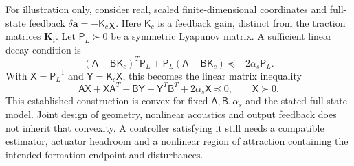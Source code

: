 For illustration only, consider real, scaled finite-dimensional coordinates
and full-state feedback $\delta\bm a=-\mathsf K_c\bm\chi$. Here
$\mathsf K_c$ is a feedback gain, distinct from the traction matrices
$\bm K_i$. Let $\mathsf P_L\succ0$ be a symmetric Lyapunov matrix. A
sufficient linear decay condition is
\begin{equation}
 (\mathsf A-\mathsf B\mathsf K_c)^T\mathsf P_L
 +\mathsf P_L(\mathsf A-\mathsf B\mathsf K_c)
 \preceq-2\alpha_s\mathsf P_L.
 \label{eq:lyapunov}
\end{equation}
With $\mathsf X=\mathsf P_L^{-1}$ and $\mathsf Y=\mathsf K_c\mathsf X$, this
becomes the linear matrix inequality
\begin{equation}
 \mathsf A\mathsf X+\mathsf X\mathsf A^T
 -\mathsf B\mathsf Y-\mathsf Y^T\mathsf B^T
       +2\alpha_s\mathsf X\preceq0,\qquad\mathsf X\succ0.
 \label{eq:feedback-lmi}
\end{equation}
This established construction \cite{boyd1994} is convex for fixed
$\mathsf A,\mathsf B,\alpha_s$ and the stated full-state model. Joint design
of geometry, nonlinear acoustics and output feedback does not inherit that
convexity. A controller satisfying it still needs a compatible estimator,
actuator headroom and a nonlinear region of attraction containing the intended
formation endpoint and disturbances.
